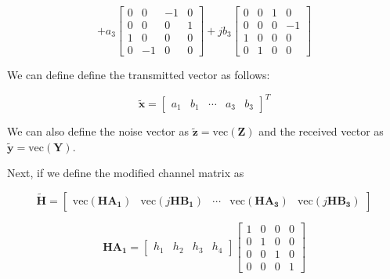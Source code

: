 \documentclass[fleqn]{article}
\begin{document}
\begin{enumerate}
\begin{enumerate}
			\begin{equation*}
				+ a_3\begin{bmatrix}
					0 &  0 & -1 & 0 \\
					0 &  0 &  0 & 1 \\
					1 &  0 &  0 & 0 \\
					0 & -1 &  0 & 0
				\end{bmatrix} + jb_3\begin{bmatrix}
					0 & 0 & 1 &  0 \\
					0 & 0 & 0 & -1 \\
					1 & 0 & 0 &  0 \\
					0 & 1 & 0 &  0
				\end{bmatrix}
			\end{equation*}
			
			We can define define the transmitted vector as follows:
			
			\begin{equation*}
				\mathbf{\tilde{x}} = \begin{bmatrix}
					a_1 & b_1 & \cdots & a_3 & b_3
				\end{bmatrix}^T
			\end{equation*}
			
			We can also define the noise vector as $\mathbf{\tilde{z}} = \text{vec}(\mathbf{Z})$ and the received vector as $\mathbf{\tilde{y}} = \text{vec}(\mathbf{Y})$.
			
			Next, if we define the modified channel matrix as
			
			\begin{equation*}
				\mathbf{\tilde{H}} = \begin{bmatrix}
					\text{vec}(\mathbf{HA_1}) & \text{vec}(j\mathbf{HB_1}) & \cdots & \text{vec}(\mathbf{HA_3}) & \text{vec}(j\mathbf{HB_3})
				\end{bmatrix}
			\end{equation*} 
			
			\begin{equation*}
				\mathbf{HA_1} = \begin{bmatrix}
					h_1 & h_2 & h_3 & h_4
				\end{bmatrix}\begin{bmatrix}
					1 & 0 & 0 & 0 \\
					0 & 1 & 0 & 0 \\
					0 & 0 & 1 & 0 \\
					0 & 0 & 0 & 1
				\end{bmatrix}
			\end{equation*}
			

\end{enumerate}
\end{enumerate}
\end{document}
